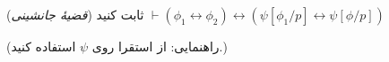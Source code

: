 (\emph{قضیهٔ جانشینی})
ثابت کنید $\vdash(\phi_1\leftrightarrow\phi_2)\leftrightarrow(\psi[\phi_1/p]\leftrightarrow\psi[\phi/p])$

(راهنمایی: از استقرا روی $\psi$ استفاده کنید.)